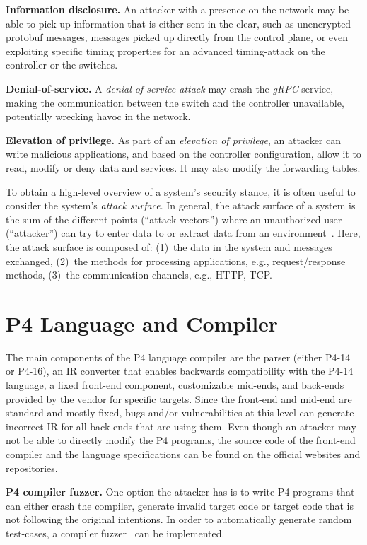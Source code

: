 \documentclass[10pt,sigconf]{acmart}
\begin{document}
\textbf{Information disclosure.} An attacker with a presence on the
  network may be able to pick up information that is either sent in
  the clear, such as unencrypted protobuf messages, messages picked up
  directly from the control plane, or even exploiting specific timing
  properties for an advanced timing-attack on the controller or the
  switches.
  
\textbf{Denial-of-service.} A \emph{denial-of-service attack} may crash
  the \emph{gRPC} service, making the communication between the switch
  and the controller unavailable, potentially wrecking havoc in the
  network.
  
\textbf{Elevation of privilege.} As part of an \emph{elevation of
    privilege}, an attacker can write malicious applications, and
  based on the controller configuration, allow it to read, modify or
  deny data and services. It may also modify the forwarding tables.

To obtain a high-level overview of a system's security
stance, it is often useful to consider the system's \emph{attack
  surface}. In general, the attack surface of a system is the sum of
the different points (``attack vectors'') where an unauthorized user
(``attacker'') can try to enter data to or extract data from an
environment~\cite{attack-surface-metric}. 
Here, the attack surface is composed of: (1)~the data in
the system and messages exchanged, (2)~the methods for processing
applications, e.g., request/response methods, (3)~the communication
channels, e.g., HTTP, TCP.


\section{P4 Language and Compiler}

The main components of the P4 language compiler are the parser (either
P4-14 or P4-16), an IR converter that enables backwards compatibility with the
P4-14 language, a fixed front-end component, customizable mid-ends, and back-ends
provided by the vendor for specific targets.
Since the front-end and mid-end are standard and mostly fixed, bugs and/or vulnerabilities
at this level can generate incorrect IR for all back-ends that are using them.
Even though an attacker may not be able to directly modify the P4 programs, the
source code of the front-end compiler and the language specifications can be found
on the official websites and repositories.


\textbf{P4 compiler fuzzer.} One option the attacker has is to write P4 programs that can either crash the
compiler, generate invalid target code or target code that is not following
the original intentions. In order to automatically generate random test-cases, a
compiler fuzzer~\cite{compfuzz} can be implemented. 
\end{document}
